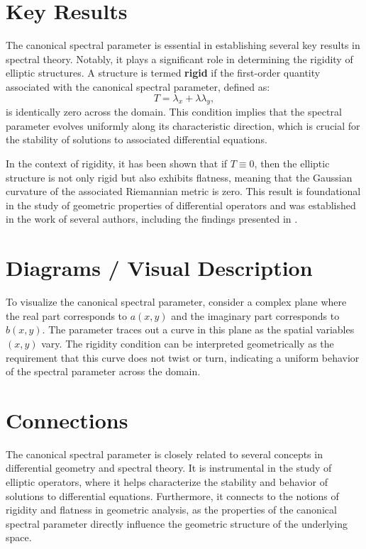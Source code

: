 \documentclass[11pt,a4paper]{article}
\begin{document}
\section{Key Results}
The canonical spectral parameter is essential in establishing several key results in spectral theory. Notably, it plays a significant role in determining the rigidity of elliptic structures. A structure is termed \textbf{rigid} if the first-order quantity associated with the canonical spectral parameter, defined as:
\begin{equation}
T = \lambda_x + \lambda \lambda_y,
\end{equation}
is identically zero across the domain. This condition implies that the spectral parameter evolves uniformly along its characteristic direction, which is crucial for the stability of solutions to associated differential equations.

In the context of rigidity, it has been shown that if $T \equiv 0$, then the elliptic structure is not only rigid but also exhibits flatness, meaning that the Gaussian curvature of the associated Riemannian metric is zero. This result is foundational in the study of geometric properties of differential operators and was established in the work of several authors, including the findings presented in \cite{2601.19274v4}.

\section{Diagrams / Visual Description}
To visualize the canonical spectral parameter, consider a complex plane where the real part corresponds to $a(x, y)$ and the imaginary part corresponds to $b(x, y)$. The parameter traces out a curve in this plane as the spatial variables $(x, y)$ vary. The rigidity condition can be interpreted geometrically as the requirement that this curve does not twist or turn, indicating a uniform behavior of the spectral parameter across the domain.

\section{Connections}
The canonical spectral parameter is closely related to several concepts in differential geometry and spectral theory. It is instrumental in the study of elliptic operators, where it helps characterize the stability and behavior of solutions to differential equations. Furthermore, it connects to the notions of rigidity and flatness in geometric analysis, as the properties of the canonical spectral parameter directly influence the geometric structure of the underlying space.
\end{document}
